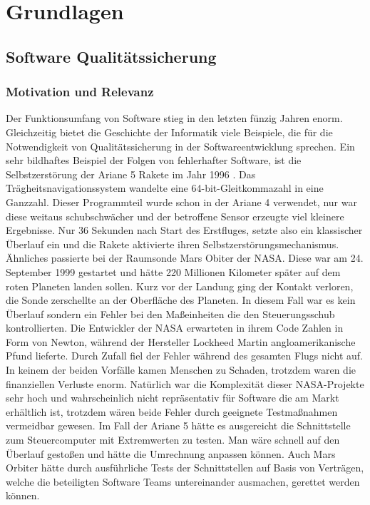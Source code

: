 \chapter{Grundlagen}
\label{sec:fundamentals}

\section{Software Qualitätssicherung}

\subsection{Motivation und Relevanz}

Der Funktionsumfang von Software stieg in den letzten fünzig Jahren enorm. Gleichzeitig bietet die Geschichte der Informatik viele Beispiele, die für die Notwendigkeit von Qualitätssicherung in der Softwareentwicklung sprechen. Ein sehr bildhaftes Beispiel der Folgen von fehlerhafter Software, ist die Selbstzerstörung der Ariane 5 Rakete im Jahr 1996 \cite{giese_warum_2002}. Das Trägheitsnavigationssystem wandelte eine 64-bit-Gleitkommazahl in eine Ganzzahl. Dieser Programmteil wurde schon in der Ariane 4 verwendet, nur war diese weitaus schubschwächer und der betroffene Sensor erzeugte viel kleinere Ergebnisse. Nur 36 Sekunden nach Start des Erstfluges, setzte also ein klassischer Überlauf ein und die Rakete aktivierte ihren Selbstzerstörungsmechanismus.
Ähnliches passierte bei der Raumsonde Mars Obiter der NASA. Diese war am 24. September 1999 gestartet und hätte 220 Millionen Kilometer später auf dem roten Planeten landen sollen. Kurz vor der Landung ging der Kontakt verloren, die Sonde zerschellte an der Oberfläche des Planeten. In diesem Fall war es kein Überlauf sondern ein Fehler bei den Maßeinheiten die den Steuerungsschub kontrollierten. Die Entwickler der NASA erwarteten in ihrem Code Zahlen in Form von Newton, während der Hersteller Lockheed Martin angloamerikanische Pfund lieferte. Durch Zufall fiel der Fehler während des gesamten Flugs nicht auf. \cite{thaller_software-test:_2002}
In keinem der beiden Vorfälle kamen Menschen zu Schaden, trotzdem waren die finanziellen Verluste enorm. Natürlich war die Komplexität dieser NASA-Projekte sehr hoch und wahrscheinlich nicht repräsentativ für Software die am Markt erhältlich ist, trotzdem wären beide Fehler durch geeignete Testmaßnahmen vermeidbar gewesen. Im Fall der Ariane 5 hätte es ausgereicht die Schnittstelle zum Steuercomputer mit Extremwerten zu testen. Man wäre schnell auf den Überlauf gestoßen und hätte die Umrechnung anpassen können. Auch Mars Orbiter hätte durch ausführliche Tests der Schnittstellen auf Basis von Verträgen, welche die beteiligten Software Teams untereinander ausmachen, gerettet werden können.

